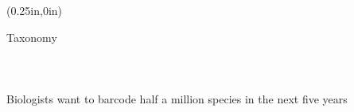 \documentclass[10pt,letterpaper]{report}
\begin{document}

\fancyhead[CO]{\parbox{7.6in}{\hskip 7.6in {\sansbold \thepage}}}

\noindent \begin{textblock*}{2in}(0.25in,0in)%
  \colorbox{ForestGreen}{\parbox[top][0.4in][c]{2in}{\color{white}
{}}}
\end{textblock*}

\begin{multicols}{3}
\noindent \begin{minipage}{\dimexpr2\textwidth+\tabcolsep}{
  {\color{red} {\sansbold Taxonomy}}\\
  {\huge {}}\\\\\\
  {\serifbold Biologists want to barcode half a million species in the next five years}
}
\end{minipage}
\noindent \lipsum[1-19]
\end{multicols}
\end{document}
